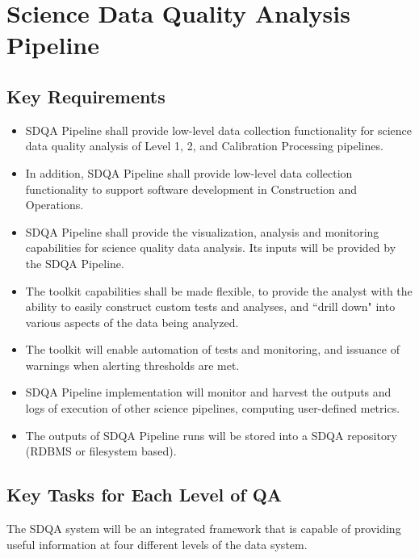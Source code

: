 \section{Science Data Quality Analysis Pipeline}

\subsection{Key Requirements}
\begin{itemize}
\item SDQA Pipeline shall provide low-level data collection functionality for science
data quality analysis of Level 1, 2, and Calibration Processing pipelines.

\item In addition, SDQA Pipeline shall provide low-level data collection functionality to support software development in Construction and Operations.

\item SDQA Pipeline shall provide the visualization, analysis and monitoring capabilities for science quality data analysis. Its inputs will be provided by the SDQA Pipeline.

\item The toolkit capabilities shall be made flexible, to provide the analyst with the ability to easily construct custom tests and analyses, and ``drill down" into various aspects of the data being analyzed.

\item The toolkit will enable automation of tests and monitoring, and issuance of warnings when alerting thresholds are met.

\item SDQA Pipeline implementation will monitor and harvest the outputs and logs of execution of other science pipelines, computing user-defined metrics.

\item The outputs of SDQA Pipeline runs will be stored into a SDQA repository (RDBMS or filesystem based).
\end{itemize}


\subsection{Key Tasks for Each Level of QA}

The SDQA system will be an integrated framework that is capable of providing useful information at four different levels of the data system.

